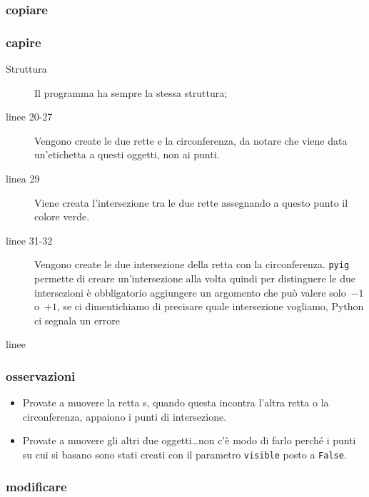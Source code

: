 \subsubsection{copiare}



\subsubsection{capire}

\begin{description}
 \item [Struttura] 
 Il programma ha sempre la stessa struttura;
 \item [linee 20-27]
Vengono create le due rette e la circonferenza, da notare che viene data 
un'etichetta a questi oggetti, non ai punti.
 \item [linea 29]
Viene creata l'intersezione tra le due rette assegnando a questo punto il 
colore verde.
 \item [linee 31-32]
Vengono create le due intersezione della retta con la circonferenza. 
\lstinline{pyig} permette di creare un'intersezione alla volta quindi per 
distinguere le due intersezioni è obbligatorio aggiungere un argomento che può 
valere solo~\(-1\) o~\(+1\), se ci dimentichiamo di precisare quale 
intersezione vogliamo, Python ci segnala un errore
 \item [linee ]
\end{description}

\subsubsection{osservazioni}

\begin{itemize}
 \item Provate a muovere la retta s, quando questa incontra l'altra retta o la 
circonferenza, appaiono i punti di intersezione.
 \item Provate a muovere gli altri due oggetti\dots non c'è modo di farlo 
perché i punti su cui si basano sono stati creati con il parametro 
\lstinline{visible} 
posto a \lstinline{False}.
\end{itemize}

\subsubsection{modificare}

